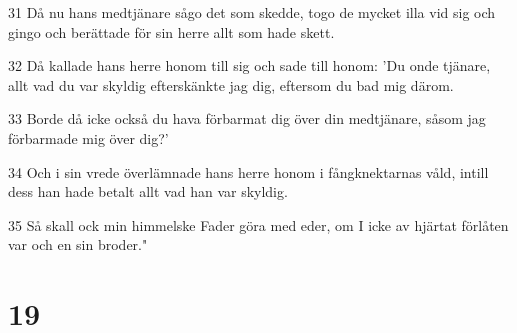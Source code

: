 \par 31 Då nu hans medtjänare sågo det som skedde, togo de mycket illa vid sig och gingo och berättade för sin herre allt som hade skett.
\par 32 Då kallade hans herre honom till sig och sade till honom: 'Du onde tjänare, allt vad du var skyldig efterskänkte jag dig, eftersom du bad mig därom.
\par 33 Borde då icke också du hava förbarmat dig över din medtjänare, såsom jag förbarmade mig över dig?'
\par 34 Och i sin vrede överlämnade hans herre honom i fångknektarnas våld, intill dess han hade betalt allt vad han var skyldig.
\par 35 Så skall ock min himmelske Fader göra med eder, om I icke av hjärtat förlåten var och en sin broder."

\chapter{19}

